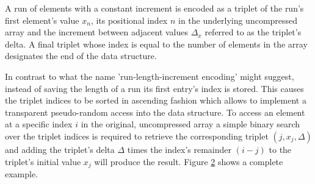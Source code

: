     \begin{figure}[ht]
      \centering
      \captionsetup{width=0.9\columnwidth}
      
      \label{fig:rli-encoding}
    \end{figure}

    A run of elements with a constant increment is encoded as a triplet of the run's first element's value $x_n$, its
    positional index $n$ in the underlying uncompressed array and the increment between adjacent values $\Delta_x$
    referred to as the triplet's delta. A final triplet whose index is equal to the number of elements in the array
    designates the end of the data structure.

    In contrast to what the name 'run-length-increment encoding' might suggest, instead of saving the length of a run
    its first entry's index is stored. This causes the triplet indices to be sorted in ascending fashion which allows to
    implement a transparent pseudo-random access into the data structure. To access an element at a specific index $i$
    in the original, uncompressed array a simple binary search over the triplet indices is required to retrieve the
    corresponding triplet $(j, x_j, \Delta)$ and adding the triplet's delta $\Delta$ times the index's remainder $(i-j)$
    to the triplet's initial value $x_j$ will produce the result. Figure \ref{fig:rli-encoding-example} shows a
    complete example.

    \begin{figure}[ht]
      \centering
      \captionsetup{width=0.9\columnwidth}
      
      \label{fig:rli-encoding-example}
    \end{figure}


